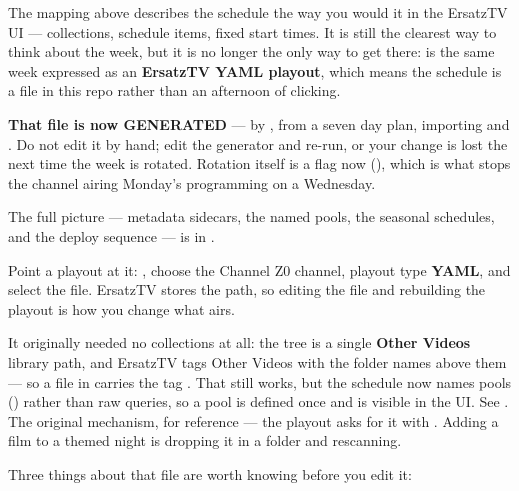 \documentclass[fontpath=fonts/,logopath=logo/]{riposte-doc}
\begin{document}

The mapping above describes the schedule the way you would  it in the ErsatzTV UI — collections, schedule items, fixed start times. It is still the clearest way to think about the week, but it is no longer the only way to get there:  is the same week expressed as an \textbf{ErsatzTV YAML playout}, which means the schedule is a file in this repo rather than an afternoon of clicking.

\textbf{That file is now GENERATED} — by , from a seven day plan, importing  and . Do not edit it by hand; edit the generator and re-run, or your change is lost the next time the week is rotated. Rotation itself is a flag now (), which is what stops the channel airing Monday's programming on a Wednesday.

The full picture — metadata sidecars, the named pools, the seasonal schedules, and the deploy sequence — is in .

Point a playout at it: , choose the Channel Z0 channel, playout type \textbf{YAML}, and select the file. ErsatzTV stores the path, so editing the file and rebuilding the playout is how you change what airs.

It originally needed no collections at all: the  tree is a single \textbf{Other Videos} library path, and ErsatzTV tags Other Videos with the folder names above them — so a file in  carries the tag . That still works, but the schedule now names pools () rather than raw queries, so a pool is defined once and is visible in the UI. See . The original mechanism, for reference — the playout asks for it with . Adding a film to a themed night is dropping it in a folder and rescanning.

Three things about that file are worth knowing before you edit it:
\end{document}
